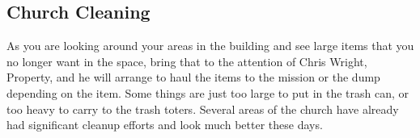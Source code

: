 \vspace{\fill}

\subsection{Church Cleaning}
\label{propertynotes}

As you are looking around your areas in the building and see large items that you no longer want in the space, bring that to the attention of Chris Wright, Property, and he will arrange to haul the items to the mission or the dump depending on the item.  Some things are just too large to put in the trash can, or too heavy to carry to the trash toters.  Several areas of the church have already had significant cleanup efforts and look much better these days.

\vspace{\fill}
